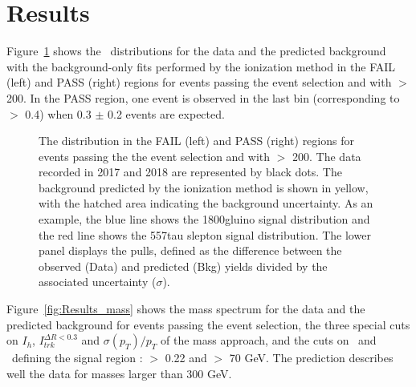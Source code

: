 \section{Results}
\label{sec:results}


Figure~\ref{fig:Results_ioniz} shows the \ias\ distributions for the data and the predicted background with the background-only fits performed
by the  ionization method
in the FAIL (left) and PASS (right) regions for events passing the event selection and with \pt $>$ 200\GeV.
In the PASS region, one event is observed in the last bin (corresponding to \ias $>$ 0.4) when 0.3 $\pm$ 0.2 events are expected. 

\begin{figure}[h!]
   \centering
        \caption{The \ias distribution in the FAIL (left) and PASS (right) regions for events passing the the event selection and with
        \pt $>$ 200\GeV. The  data recorded in 2017 and 2018 are represented by black dots.
        The background predicted by the ionization method  is shown in yellow,
        with the hatched area indicating the background uncertainty.
       As an example, the blue line shows the 1800\GeV gluino signal distribution and the  red line shows the 557\GeV tau slepton signal distribution.
        The lower panel displays the pulls, defined as the difference between the observed (Data) and predicted (Bkg) yields divided by the associated
        uncertainty ($\sigma$).}
   \label{fig:Results_ioniz}
\end{figure}

Figure~\ref{fig:Results_mass} shows the mass spectrum for the data and the predicted background for events passing the event selection, the three special cuts on $I_h$,  
$I_{trk}^{\Delta R< 0.3}$ and  $\sigma(p_T)/p_T$ of the mass approach, and the cuts on \ias\ and \pt\ defining the signal region : \ias $>$ 0.22 and \pt $>$ 70 GeV. 
The prediction describes well the data for masses larger than 300 GeV.

